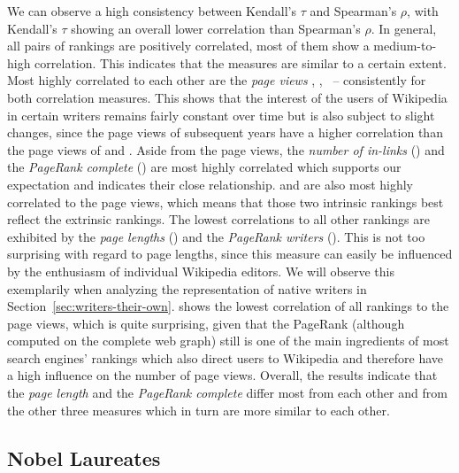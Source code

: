 \documentclass[a4paper,12pt]{scrartcl}
\begin{document}
% 
%
We can observe a high consistency between Kendall's $\tau$ and
Spearman's $\rho$, with Kendall's $\tau$ showing an overall lower
correlation than Spearman's $\rho$. 
%
In general, all pairs of rankings are positively correlated, most of
them show a medium-to-high correlation. This indicates that the
measures are similar to a certain extent.
%
Most highly correlated to each other are the \emph{page views}
\rpvtwo, \rpvthree, \rpvfour\ -- consistently for both correlation
measures. This shows that the interest of the users of Wikipedia in
certain writers remains fairly constant over time but is also subject
to slight changes, since the page views of subsequent years have a
higher correlation than the page views of \rpvtwo and \rpvfour.
%
Aside from the page views, the \emph{number of in-links} (\rinlinks)
and the \emph{PageRank complete} (\rprcomplete) are most highly
correlated which supports our expectation and indicates their close
relationship.
%
\rinlinks and \rprcomplete are also most highly correlated to the page
views, which means that those two intrinsic rankings best reflect the
extrinsic rankings.
%
The lowest correlations to all other rankings are exhibited by the
\emph{page lengths} (\rpagelen) and the \emph{PageRank writers}
(\rprwriter).
%
This is not too surprising with regard to page lengths, since this measure
can easily be influenced by the enthusiasm of individual Wikipedia
editors. We will observe this exemplarily when analyzing the
representation of native writers in
Section~\ref{sec:writers-their-own}.
%
\rprwriter shows the lowest correlation of all rankings to the page
views, which is quite surprising, given that the PageRank (although
computed on the complete web graph) still is one of the main
ingredients of most search engines' rankings which also direct users
to Wikipedia and therefore have a high influence on the number of page
views.
%
%
%
Overall, the results indicate that the \emph{page length} and the
\emph{PageRank complete} differ most from each other and from the
other three measures which in turn  are more similar to each other.






\subsection{Nobel Laureates}\label{sec:nobel-laureates}
\end{document}
